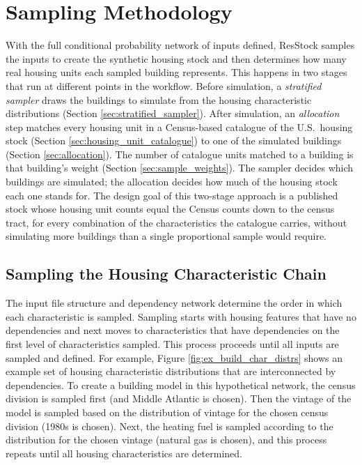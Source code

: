 \section{Sampling Methodology} \label{sec:sampling_methodology}
With the full conditional probability network of inputs defined, ResStock samples the inputs to create the synthetic housing stock and then determines how many real housing units each sampled building represents. This happens in two stages that run at different points in the workflow. Before simulation, a \textit{stratified sampler} draws the buildings to simulate from the housing characteristic distributions (Section \ref{sec:stratified_sampler}). After simulation, an \textit{allocation} step matches every housing unit in a Census-based catalogue of the U.S.~housing stock (Section \ref{sec:housing_unit_catalogue}) to one of the simulated buildings (Section \ref{sec:allocation}). The number of catalogue units matched to a building is that building's weight (Section \ref{sec:sample_weights}). The sampler decides which buildings are simulated; the allocation decides how much of the housing stock each one stands for. The design goal of this two-stage approach is a published stock whose housing unit counts equal the Census counts down to the census tract, for every combination of the characteristics the catalogue carries, without simulating more buildings than a single proportional sample would require.

\subsection{Sampling the Housing Characteristic Chain}\label{sec:sampling_chain}
The input file structure and dependency network determine the order in which each characteristic is sampled. Sampling starts with housing features that have no dependencies and next moves to characteristics that have dependencies on the first level of characteristics sampled. This process proceeds until all inputs are sampled and defined. For example, Figure \ref{fig:ex_build_char_distrs} shows an example set of housing characteristic distributions that are interconnected by dependencies. To create a building model in this hypothetical network, the census division is sampled first (and Middle Atlantic is chosen). Then the vintage of the model is sampled based on the distribution of vintage for the chosen census division (1980s is chosen). Next, the heating fuel is sampled according to the distribution for the chosen vintage (natural gas is chosen), and this process repeats until all housing characteristics are determined.


